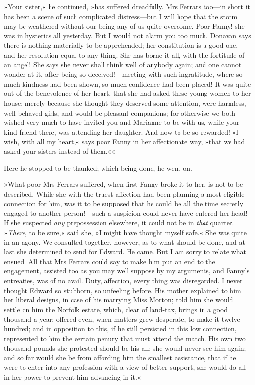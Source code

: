 »Your sister,« he continued, »has suffered dreadfully. Mrs Ferrars too—in short it has been a scene of such complicated distress—but I will hope that the storm may be weathered without our being any of us quite overcome. Poor Fanny! she was in hysterics all yesterday. But I would not alarm you too much. Donavan says there is nothing materially to be apprehended; her constitution is a good one, and her resolution equal to any thing. She has borne it all, with the fortitude of an angel! She says she never shall think well of anybody again; and one cannot wonder at it, after being so deceived!—meeting with such ingratitude, where so much kindness had been shown, so much confidence had been placed! It was quite out of the benevolence of her heart, that she had asked these young women to her house; merely because she thought they deserved some attention, were harmless, well-behaved girls, and would be pleasant companions; for otherwise we both wished very much to have invited you and Marianne to be with us, while your kind friend there, was attending her daughter. And now to be so rewarded! »I wish, with all my heart,« says poor Fanny in her affectionate way, »that we had asked your sisters instead of them.««

Here he stopped to be thanked; which being done, he went on.

»What poor Mrs Ferrars suffered, when first Fanny broke it to her, is not to be described. While she with the truest affection had been planning a most eligible connection for him, was it to be supposed that he could be all the time secretly engaged to another person!—such a suspicion could never have entered her head! If she suspected \textit{any} prepossession elsewhere, it could not be in \textit{that} quarter. »\textit{There}, to be sure,« said she, »I might have thought myself safe.« She was quite in an agony. We consulted together, however, as to what should be done, and at last she determined to send for Edward. He came. But I am sorry to relate what ensued. All that Mrs Ferrars could say to make him put an end to the engagement, assisted too as you may well suppose by my arguments, and Fanny’s entreaties, was of no avail. Duty, affection, every thing was disregarded. I never thought Edward so stubborn, so unfeeling before. His mother explained to him her liberal designs, in case of his marrying Miss Morton; told him she would settle on him the Norfolk estate, which, clear of land-tax, brings in a good thousand a-year; offered even, when matters grew desperate, to make it twelve hundred; and in opposition to this, if he still persisted in this low connection, represented to him the certain penury that must attend the match. His own two thousand pounds she protested should be his all; she would never see him again; and so far would she be from affording him the smallest assistance, that if he were to enter into any profession with a view of better support, she would do all in her power to prevent him advancing in it.«

